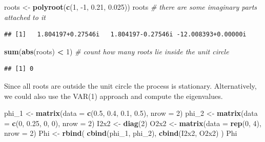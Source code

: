 \documentclass[12pt,a4paper]{article}
\newenvironment{Shaded}{\begin{snugshade}}{\end{snugshade}}
\newcommand{\CommentTok}[1]{\textcolor[rgb]{0.56,0.35,0.01}{\textit{#1}}}
\newcommand{\DataTypeTok}[1]{\textcolor[rgb]{0.13,0.29,0.53}{#1}}
\newcommand{\DecValTok}[1]{\textcolor[rgb]{0.00,0.00,0.81}{#1}}
\newcommand{\FloatTok}[1]{\textcolor[rgb]{0.00,0.00,0.81}{#1}}
\newcommand{\KeywordTok}[1]{\textcolor[rgb]{0.13,0.29,0.53}{\textbf{#1}}}
\newcommand{\NormalTok}[1]{#1}
\newcommand{\OperatorTok}[1]{\textcolor[rgb]{0.81,0.36,0.00}{\textbf{#1}}}
\newcommand{\StringTok}[1]{\textcolor[rgb]{0.31,0.60,0.02}{#1}}
\begin{document}
\begin{Shaded}
\begin{Highlighting}[]
\NormalTok{roots <-}\StringTok{ }\KeywordTok{polyroot}\NormalTok{(}\KeywordTok{c}\NormalTok{(}\DecValTok{1}\NormalTok{, }\DecValTok{-1}\NormalTok{, }\FloatTok{0.21}\NormalTok{, }\FloatTok{0.025}\NormalTok{))}
\NormalTok{roots }\CommentTok{# there are some imaginary parts attached to it}
\end{Highlighting}
\end{Shaded}

\begin{verbatim}
## [1]   1.804197+0.27546i   1.804197-0.27546i -12.008393+0.00000i
\end{verbatim}

\begin{Shaded}
\begin{Highlighting}[]
\KeywordTok{sum}\NormalTok{(}\KeywordTok{abs}\NormalTok{(roots) }\OperatorTok{<}\StringTok{ }\DecValTok{1}\NormalTok{) }\CommentTok{# count how many roots lie inside the unit circle}
\end{Highlighting}
\end{Shaded}

\begin{verbatim}
## [1] 0
\end{verbatim}

Since all roots are outside the unit circle the process is stationary.
Alternatively, we could also use the VAR(1) approach and compute the
eigenvalues.

\begin{Shaded}
\begin{Highlighting}[]
\NormalTok{phi_}\DecValTok{1}\NormalTok{ <-}\StringTok{ }\KeywordTok{matrix}\NormalTok{(}\DataTypeTok{data =} \KeywordTok{c}\NormalTok{(}\FloatTok{0.5}\NormalTok{, }\FloatTok{0.4}\NormalTok{, }\FloatTok{0.1}\NormalTok{, }\FloatTok{0.5}\NormalTok{), }\DataTypeTok{nrow =} \DecValTok{2}\NormalTok{)}
\NormalTok{phi_}\DecValTok{2}\NormalTok{ <-}\StringTok{ }\KeywordTok{matrix}\NormalTok{(}\DataTypeTok{data =} \KeywordTok{c}\NormalTok{(}\DecValTok{0}\NormalTok{, }\FloatTok{0.25}\NormalTok{, }\DecValTok{0}\NormalTok{, }\DecValTok{0}\NormalTok{), }\DataTypeTok{nrow =} \DecValTok{2}\NormalTok{)}
\NormalTok{I2x2 <-}\StringTok{ }\KeywordTok{diag}\NormalTok{(}\DecValTok{2}\NormalTok{)}
\NormalTok{O2x2 <-}\StringTok{ }\KeywordTok{matrix}\NormalTok{(}\DataTypeTok{data =} \KeywordTok{rep}\NormalTok{(}\DecValTok{0}\NormalTok{, }\DecValTok{4}\NormalTok{), }\DataTypeTok{nrow =} \DecValTok{2}\NormalTok{)}
\NormalTok{Phi <-}\StringTok{ }\KeywordTok{rbind}\NormalTok{( }\KeywordTok{cbind}\NormalTok{(phi_}\DecValTok{1}\NormalTok{, phi_}\DecValTok{2}\NormalTok{), }\KeywordTok{cbind}\NormalTok{(I2x2, O2x2) )}
\NormalTok{Phi}
\end{Highlighting}
\end{Shaded}
\end{document}
